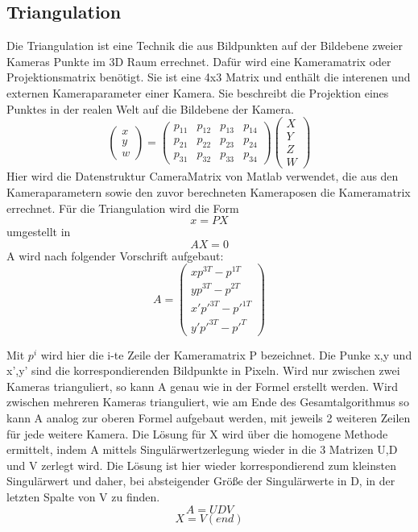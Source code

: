 \subsection{Triangulation}
\label{sec:Triangulation}
Die Triangulation ist eine Technik die aus Bildpunkten auf der Bildebene zweier Kameras Punkte im 3D Raum errechnet. Dafür wird eine Kameramatrix oder Projektionsmatrix benötigt. Sie ist eine 4x3 Matrix und enthält die interenen und externen Kameraparameter einer Kamera.  Sie beschreibt die Projektion eines Punktes in der realen Welt auf die Bildebene der Kamera.
$$ \begin{pmatrix} x\\y\\w \end{pmatrix} =  \begin{pmatrix} p_{11} & p_{12} & p_{13} & p_{14}\\  p_{21} & p_{22} & p_{23} & p_{24} \\  p_{31} & p_{32} & p_{33} & p_{34}  \end{pmatrix} \begin{pmatrix} X\\Y\\Z\\W \end{pmatrix}$$
Hier wird die Datenstruktur CameraMatrix von Matlab verwendet, die aus den Kameraparametern sowie den zuvor berechneten Kameraposen die Kameramatrix errechnet.
Für die Triangulation wird die Form
$$x = PX$$
umgestellt in
$$AX = 0$$
A wird nach folgender Vorschrift aufgebaut:
$$A = \begin{pmatrix} xp^{3T} - p^{1T} \\ yp^{3T} - p^{2T} \\ x'p'^{3T} - p'^{1T} \\ y'p'^{3T} - p'^{T} \end{pmatrix}$$

Mit $p^i$ wird hier die i-te Zeile der Kameramatrix P bezeichnet. Die Punke x,y und x’,y’ sind die korrespondierenden Bildpunkte in Pixeln. Wird nur zwischen zwei Kameras trianguliert, so kann A genau wie in der Formel erstellt werden. Wird zwischen mehreren Kameras trianguliert, wie am Ende des Gesamtalgorithmus so kann A analog zur oberen Formel aufgebaut werden, mit jeweils 2 weiteren Zeilen für jede weitere Kamera.
Die Lösung für X wird über die homogene Methode ermittelt, indem A mittels Singulärwertzerlegung wieder in die 3 Matrizen U,D und V zerlegt wird. Die Lösung ist hier wieder korrespondierend zum kleinsten Singulärwert und daher, bei absteigender Größe der Singulärwerte in D,  in der letzten Spalte von V zu finden. \cite{Richard2000}
$$A = UDV$$
$$X = V(end)$$

